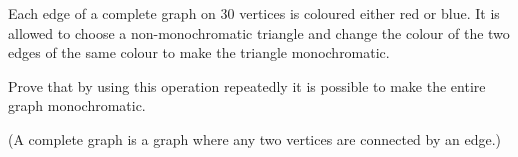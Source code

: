 Each edge of a complete graph on $30$ vertices is coloured either red or blue. It is allowed to choose a non-monochromatic triangle and change the colour of the two edges of the same colour to make the triangle monochromatic.

Prove that by using this operation repeatedly it is possible to make the entire graph monochromatic.

(A complete graph is a graph where any two vertices are connected by an edge.)
